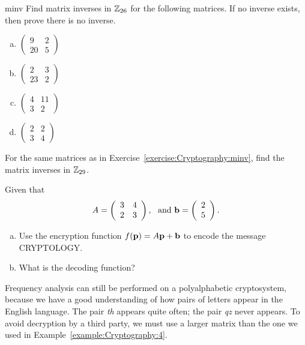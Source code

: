 \begin{exercise}{minv}
Find matrix inverses in ${\Bbb Z}_{26}$ for the following matrices. If no inverse exists, then prove there is no inverse.
\begin{multicols}{2}
\begin{enumerate}[(a)]
\item
$\left( \begin{array}{cc} 9 & 2 \\ 20 & 5 \end{array} \right)$
\item
$\left( \begin{array}{cc} 2 & 3 \\ 23 & 2 \end{array} \right)$
\item
$\left( \begin{array}{cc} 4 & 11 \\ 3 & 2 \end{array} \right)$
\item
$\left( \begin{array}{cc} 2 & 2 \\ 3 & 4 \end{array} \right)$
\end{enumerate}
\end{multicols}
\end{exercise}
 \begin{exercise}{}
For the same matrices as in Exercise~\ref{exercise:Cryptography:minv}, find the matrix inverses in ${\Bbb Z}_{29}$.
\end{exercise}

\begin{exercise}{}
Given that
$$
A =
\left(
\begin{array}{cc}
3 & 4 \\
2 & 3
\end{array}
\right),~~ \text{and~} {\bold b} = \left( \begin{array}{c} 2 \\ 5 \end{array}\right).$$
\begin{enumerate}[(a)]
\item
Use the encryption function $f({\bold p}) = A {\bold p} + {\bold b}$
to encode the message CRYPTOLOGY.  
\item
What is the decoding function?  
\end{enumerate}
 \end{exercise}
 
Frequency analysis can still be performed on a polyalphabetic
cryptosystem, because we have a good understanding of how pairs of
letters appear in the English language. The pair {\em th} appears
quite often; the pair {\em qz} never appears.  To avoid decryption by
a third party, we must use a larger matrix than the one we used in
Example~\ref{example:Cryptography:4}. 
  
